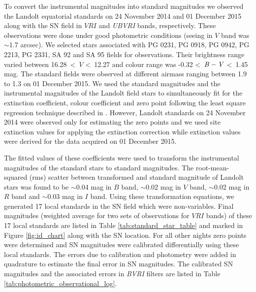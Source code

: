 \documentclass[fleqn,usenatbib]{mnras}
\begin{document}
To convert the instrumental magnitudes into standard magnitudes we observed the Landolt equatorial standards  \citep{2009AJ....137.4186L} on 24 November 2014 and 01 December 2015 along with the SN field in $VRI$ and {\it UBVRI} bands, respectively. These observations were done under good photometric conditions (seeing in $V$ band was $\sim$1.7 arcsec). We selected stars associated with PG 0231, PG 0918, PG 0942, PG 2213, PG 2331, SA 92 and SA 95 fields for observations. Their brightness range varied between 16.28~\textless~$V$ \textless~12.27 and colour range was -0.32 \textless~${\it B}-{\it V}$ \textless~1.45 mag. The standard fields were observed at different airmass ranging between 1.9 to 1.3 on 01 December 2015. We used the standard magnitudes and the instrumental magnitudes of the Landolt field stars to simultaneously fit for the extinction coefficient, colour coefficient and zero point following the least square regression technique described in \cite{1992JRASC..86...71S}. However, Landolt standards on 24 November 2014 were observed only for estimating the zero points and we used site extinction values \citep{2008BASI...36..111S} for applying the extinction correction while extinction values were derived for the data acquired on 01 December 2015. 

The fitted values of these coefficients were used to transform the instrumental magnitudes of the standard stars to standard magnitudes. The root-mean-squared (rms) scatter between transformed and standard magnitude of Landolt stars was found to be $\sim$0.04 mag in $B$ band, $\sim$0.02 mag in $V$ band, $\sim$0.02 mag in $R$ band and $\sim$0.03 mag in $I$ band. Using these transformation equations, we generated 17 local standards in the SN field which were non-variables. Final magnitudes (weighted average for two sets of observations for $VRI$ bands) of these 17 local standards are listed in Table \ref{tab:standard_star_table} and marked in Figure \ref{fig:id_chart} along with the SN location. For all other nights zero points were determined and SN magnitudes were calibrated differentially using these local standards. The errors due to calibration and photometry were added in quadrature to estimate the final error in SN magnitudes. The calibrated SN magnitudes and the associated errors in {\it BVRI} filters are listed in Table \ref{tab:photometric_observational_log}. 
\end{document}
